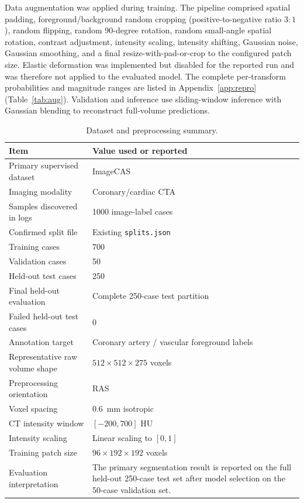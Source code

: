 \documentclass[anonymous]{iopjournal}
\begin{document}
Data augmentation was applied during training. The pipeline comprised spatial padding, foreground/background random cropping (positive-to-negative ratio $3{:}1$), random flipping, random 90-degree rotation, random small-angle spatial rotation, contrast adjustment, intensity scaling, intensity shifting, Gaussian noise, Gaussian smoothing, and a final resize-with-pad-or-crop to the configured patch size. Elastic deformation was implemented but disabled for the reported run and was therefore not applied to the evaluated model. The complete per-transform probabilities and magnitude ranges are listed in Appendix~\ref{app:repro} (Table~\ref{tab:aug}). Validation and inference use sliding-window inference with Gaussian blending to reconstruct full-volume predictions.

\begin{table}[!htbp]
\centering
\caption{Dataset and preprocessing summary.}
\label{tab:dataset}
\begin{threeparttable}
\footnotesize
\begin{tabularx}{0.92\textwidth}{L{0.38\textwidth}Y}
\toprule
\textbf{Item} & \textbf{Value used or reported} \\
\midrule
Primary supervised dataset & ImageCAS \\
Imaging modality & Coronary/cardiac CTA \\
Samples discovered in logs & 1000 image-label cases \\
Confirmed split file & Existing \texttt{splits.json} \\
Training cases & 700 \\
Validation cases & 50 \\
Held-out test cases & 250 \\
Final held-out evaluation & Complete 250-case test partition \\
Failed held-out test cases & 0 \\
Annotation target & Coronary artery / vascular foreground labels \\
Representative raw volume shape & $512\times512\times275$ voxels \\
Preprocessing orientation & RAS \\
Voxel spacing & \SI{0.6}{mm} isotropic \\
CT intensity window & $[-200,700]$ HU \\
Intensity scaling & Linear scaling to $[0,1]$ \\
Training patch size & $96\times192\times192$ voxels \\
Evaluation interpretation & The primary segmentation result is reported on the full held-out 250-case test set after model selection on the 50-case validation set. \\
\bottomrule
\end{tabularx}
\end{threeparttable}
\end{table}
\end{document}
